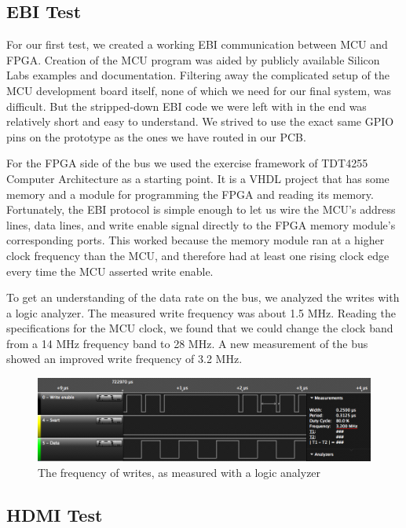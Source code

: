 \subsection{EBI Test}
For our first test, we created a working EBI communication between MCU and FPGA.
Creation of the MCU program was aided by publicly available Silicon Labs examples and documentation.
Filtering away the complicated setup of the MCU development board itself, none of which we need for our final system, was difficult.
But the stripped-down EBI code we were left with in the end was relatively short and easy to understand.
We strived to use the exact same GPIO pins on the prototype as the ones we have routed in our PCB.

For the FPGA side of the bus we used the exercise framework of TDT4255 Computer Architecture as a starting point.
It is a VHDL project that has some memory and a module for programming the FPGA and reading its memory.
Fortunately, the EBI protocol is simple enough to let us wire the MCU's address lines, data lines, and write enable signal directly to the FPGA memory module's corresponding ports.
This worked because the memory module ran at a higher clock frequency than the MCU, and therefore had at least one rising clock edge every time the MCU asserted write enable.

To get an understanding of the data rate on the bus, we analyzed the writes with a logic analyzer.
The measured write frequency was about 1.5 MHz.
Reading the specifications for the MCU clock, we found that we could change the clock band from a 14 MHz frequency band to 28 MHz.
A new measurement of the bus showed an improved write frequency of 3.2 MHz.

\begin{figure}[htp]
\centering
\includegraphics[width=\textwidth]{diagrams/ebi_bus_write_speed.png}
\caption{The frequency of writes, as measured with a logic analyzer}
\label{ebi_bis_write_speed}
\end{figure}

\subsection{HDMI Test}

